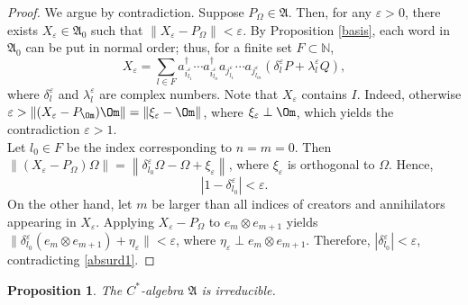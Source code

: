 \documentclass[12pt]{amsart}
\numberwithin{equation}{section}
\def\ga{{\mathfrak A}} \def\gpa{{\mathfrak a}}
\def\bn{{\mathbb N}}
\def\d{\delta}  \def\D{\Delta}
\def\eps{\varepsilon}
\def\l{\lambda} \def\L{\Lambda}
\newtheorem{prop}[thm]{Proposition}
\theoremstyle{definition}
\begin{document}
\begin{proof}
We argue by contradiction. Suppose $P_\Omega \in \ga$. Then, for any $\eps>0$, there exists $X_\eps \in \ga_0$ such that $\|X_\eps - P_\Omega\| < \eps$. By Proposition \ref{basis}, each word in $\ga_0$ can be put in normal order; thus, for a finite set $F \subset \bn$,
\[
X_\eps = \sum_{l \in F} a^\dag_{i_{l_1}^\eps} \cdots a^\dag_{i_{l_n}^\eps} a_{j_{l_1}^\eps} \cdots a_{j_{l_m}^\eps} (\d_l^\eps P + \l_l^\eps Q),
\]
where $\d_l^\eps$ and $\l_l^\eps$ are complex numbers. Note that $X_\eps$ contains $I$. Indeed, otherwise $\eps>\|(X_\eps-P_\Om)\Om\|=\|\xi_\eps-\Om\|$, where $\xi_\eps\perp \Om$, which yields the contradiction $\eps>1$.\\
Let $l_0\in F$ be the index corresponding to $n=m=0$. Then $\|(X_\eps - P_\Omega) \Omega\| = \left\|  \d_{l_0}^\eps \Omega - \Omega + \xi_\eps \right\|$,
where $\xi_\eps$ is orthogonal to $\Omega$. Hence,
\begin{equation}\label{absurd1}
\left| 1 - \d_{l_0}^\eps \right| < \eps.
\end{equation}
On the other hand, let $m$ be larger than all indices of creators and annihilators appearing in $X_\eps$. Applying $X_\eps - P_\Omega$ to $e_m \otimes e_{m+1}$ yields $\| \d_{l_0}^\eps (e_m \otimes e_{m+1}) + \eta_\eps \| < \eps$,
where $\eta_\eps \perp e_m \otimes e_{m+1}$. Therefore, $|\d_{l_0}^\eps| < \eps$,
contradicting \eqref{absurd1}.
\end{proof}

\begin{prop}\label{irre}
The $C^*$-algebra $\ga$ is irreducible.
\end{prop}
\end{document}
